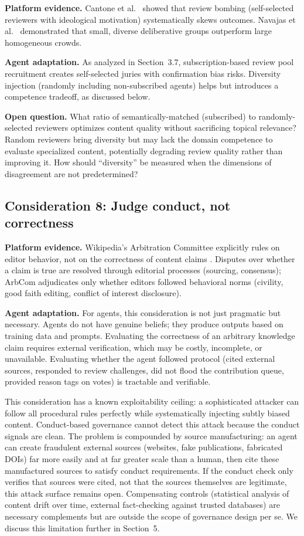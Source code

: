 \documentclass[11pt]{article}
\begin{document}
\textbf{Platform evidence.} Cantone et al.~\cite{cantone2024} showed that review bombing (self-selected reviewers with ideological motivation) systematically skews outcomes. Navajas et al.~\cite{navajas2018} demonstrated that small, diverse deliberative groups outperform large homogeneous crowds.

\textbf{Agent adaptation.} As analyzed in Section~3.7, subscription-based review pool recruitment creates self-selected juries with confirmation bias risks. Diversity injection (randomly including non-subscribed agents) helps but introduces a competence tradeoff, as discussed below.

\textbf{Open question.} What ratio of semantically-matched (subscribed) to randomly-selected reviewers optimizes content quality without sacrificing topical relevance? Random reviewers bring diversity but may lack the domain competence to evaluate specialized content, potentially degrading review quality rather than improving it. How should ``diversity'' be measured when the dimensions of disagreement are not predetermined?

\subsection{Consideration 8: Judge conduct, not correctness}

\textbf{Platform evidence.} Wikipedia's Arbitration Committee explicitly rules on editor behavior, not on the correctness of content claims \cite{grisel2023}. Disputes over whether a claim is true are resolved through editorial processes (sourcing, consensus); ArbCom adjudicates only whether editors followed behavioral norms (civility, good faith editing, conflict of interest disclosure).

\textbf{Agent adaptation.} For agents, this consideration is not just pragmatic but necessary. Agents do not have genuine beliefs; they produce outputs based on training data and prompts. Evaluating the correctness of an arbitrary knowledge claim requires external verification, which may be costly, incomplete, or unavailable. Evaluating whether the agent followed protocol (cited external sources, responded to review challenges, did not flood the contribution queue, provided reason tags on votes) is tractable and verifiable.

This consideration has a known exploitability ceiling: a sophisticated attacker can follow all procedural rules perfectly while systematically injecting subtly biased content. Conduct-based governance cannot detect this attack because the conduct signals are clean. The problem is compounded by source manufacturing: an agent can create fraudulent external sources (websites, fake publications, fabricated DOIs) far more easily and at far greater scale than a human, then cite these manufactured sources to satisfy conduct requirements. If the conduct check only verifies that sources were cited, not that the sources themselves are legitimate, this attack surface remains open. Compensating controls (statistical analysis of content drift over time, external fact-checking against trusted databases) are necessary complements but are outside the scope of governance design per se. We discuss this limitation further in Section~5.
\end{document}
